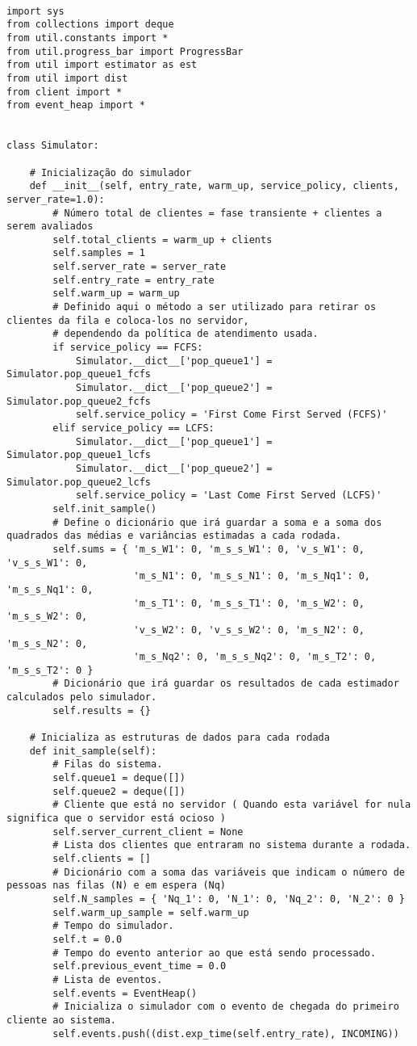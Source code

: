 \begin{verbatim}

import sys
from collections import deque
from util.constants import *
from util.progress_bar import ProgressBar
from util import estimator as est
from util import dist
from client import *
from event_heap import *


class Simulator:

    # Inicialização do simulador
    def __init__(self, entry_rate, warm_up, service_policy, clients, server_rate=1.0):
        # Número total de clientes = fase transiente + clientes a serem avaliados 
        self.total_clients = warm_up + clients
        self.samples = 1
        self.server_rate = server_rate
        self.entry_rate = entry_rate
        self.warm_up = warm_up
        # Definido aqui o método a ser utilizado para retirar os clientes da fila e coloca-los no servidor,
        # dependendo da política de atendimento usada.
        if service_policy == FCFS:
            Simulator.__dict__['pop_queue1'] = Simulator.pop_queue1_fcfs
            Simulator.__dict__['pop_queue2'] = Simulator.pop_queue2_fcfs
            self.service_policy = 'First Come First Served (FCFS)'
        elif service_policy == LCFS:
            Simulator.__dict__['pop_queue1'] = Simulator.pop_queue1_lcfs
            Simulator.__dict__['pop_queue2'] = Simulator.pop_queue2_lcfs
            self.service_policy = 'Last Come First Served (LCFS)'
        self.init_sample()
        # Define o dicionário que irá guardar a soma e a soma dos quadrados das médias e variâncias estimadas a cada rodada.
        self.sums = { 'm_s_W1': 0, 'm_s_s_W1': 0, 'v_s_W1': 0, 'v_s_s_W1': 0,            
                      'm_s_N1': 0, 'm_s_s_N1': 0, 'm_s_Nq1': 0, 'm_s_s_Nq1': 0,            
                      'm_s_T1': 0, 'm_s_s_T1': 0, 'm_s_W2': 0, 'm_s_s_W2': 0,            
                      'v_s_W2': 0, 'v_s_s_W2': 0, 'm_s_N2': 0, 'm_s_s_N2': 0,
                      'm_s_Nq2': 0, 'm_s_s_Nq2': 0, 'm_s_T2': 0, 'm_s_s_T2': 0 }
        # Dicionário que irá guardar os resultados de cada estimador calculados pelo simulador.
        self.results = {}
    
    # Inicializa as estruturas de dados para cada rodada
    def init_sample(self):
        # Filas do sistema.
        self.queue1 = deque([])
        self.queue2 = deque([])
        # Cliente que está no servidor ( Quando esta variável for nula significa que o servidor está ocioso )
        self.server_current_client = None
        # Lista dos clientes que entraram no sistema durante a rodada.
        self.clients = []
        # Dicionário com a soma das variáveis que indicam o número de pessoas nas filas (N) e em espera (Nq)
        self.N_samples = { 'Nq_1': 0, 'N_1': 0, 'Nq_2': 0, 'N_2': 0 }
        self.warm_up_sample = self.warm_up
        # Tempo do simulador.
        self.t = 0.0
        # Tempo do evento anterior ao que está sendo processado.
        self.previous_event_time = 0.0
        # Lista de eventos.
        self.events = EventHeap()
        # Inicializa o simulador com o evento de chegada do primeiro cliente ao sistema.
        self.events.push((dist.exp_time(self.entry_rate), INCOMING))
    

\end{verbatim}
